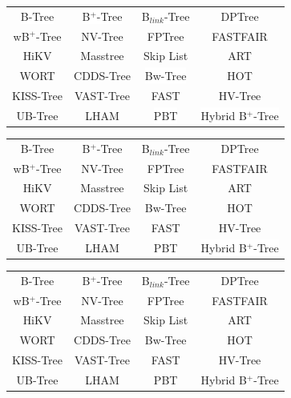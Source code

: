 \documentclass[usenames,dvipsnames, 18pt, compress, aspectratio=169]{beamer}
\begin{document}
\begin{frame}[fragile]{}
    \frametitle{}

    \def\arraystretch{1.5}
    \begin{overprint}[8cm]
        \begin{tabular}{cccc}
            \colorbox{white}{B-Tree} & \colorbox{white}{B$^{+}$-Tree} & \colorbox{white}{B$_{link}$-Tree} & \colorbox{white}{DPTree} \\
            wB$^{+}$-Tree & NV-Tree & FPTree & FASTFAIR \\
            HiKV & Masstree & Skip List & ART \\
            WORT & CDDS-Tree & \colorbox{white}{Bw-Tree} & HOT \\
            KISS-Tree & VAST-Tree & FAST & HV-Tree \\
            UB-Tree & LHAM & \colorbox{white}{PBT} & \colorbox{white}{Hybrid B$^{+}$-Tree}
        \end{tabular}

        \begin{tabular}{cccc}
            \colorbox{red!20}{B-Tree} & \colorbox{red!20}{B$^{+}$-Tree} & \colorbox{red!20}{B$_{link}$-Tree} & DPTree \\
            wB$^{+}$-Tree & NV-Tree & FPTree & FASTFAIR \\
            HiKV & Masstree & Skip List & ART \\
            WORT & CDDS-Tree & \colorbox{white}{Bw-Tree} & HOT \\
            KISS-Tree & VAST-Tree & FAST & HV-Tree \\
            UB-Tree & LHAM & \colorbox{white}{PBT} & \colorbox{white}{Hybrid B$^{+}$-Tree}
        \end{tabular}

        \begin{tabular}{cccc}
            \colorbox{red!20}{B-Tree} & \colorbox{red!20}{B$^{+}$-Tree} & \colorbox{red!20}{B$_{link}$-Tree} & \colorbox{red!20}{DPTree} \\
            wB$^{+}$-Tree & NV-Tree & FPTree & FASTFAIR \\
            HiKV & Masstree & Skip List & ART \\
            WORT & CDDS-Tree & \colorbox{red!20}{Bw-Tree} & HOT \\
            KISS-Tree & VAST-Tree & FAST & HV-Tree \\
            UB-Tree & LHAM & \colorbox{red!20}{PBT} & \colorbox{red!20}{Hybrid B$^{+}$-Tree}
        \end{tabular}

    \end{overprint}

\end{frame}
\end{document}
